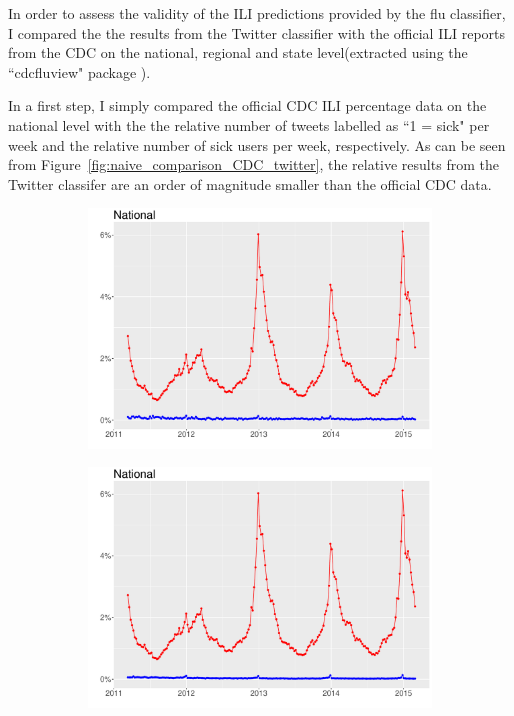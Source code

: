 \documentclass[11pt, a4paper,twoside]{report}\usepackage[]{graphicx}\usepackage[]{color}
\begin{document}
In order to assess the validity of the ILI predictions provided by the flu classifier, I compared the the results from the Twitter classifier with the official ILI reports from the CDC on the national, regional and state level(extracted using the ``cdcfluview" package ).\newline

In a first step, I simply compared the official CDC ILI percentage data on the national level with the the relative number of tweets labelled as ``1 = sick" per week and the relative number of sick users per week, respectively. As can be seen from Figure~\ref{fig:naive_comparison_CDC_twitter}, the relative results from the Twitter classifer are an order of magnitude smaller than the official CDC data.

\begin{figure}[H]
\centering
  \begin{subfigure}[t]{0.49\textwidth}
  \includegraphics[width=1\linewidth]{cdc_twitter_comp_nat_raw.pdf}
  \caption{}
  \end{subfigure}
\hfill
  \begin{subfigure}[t]{0.49\textwidth}
  \includegraphics[width=1\linewidth]{cdc_twitter_comp_nat_raw_user.pdf}

\end{subfigure}
\end{figure}
\end{document}
